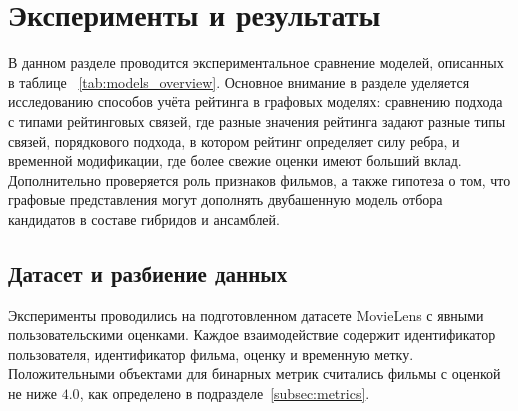 \documentclass[12pt,fleqn]{article}
\begin{document}
\section{Эксперименты и результаты}
\label{sec:experiments}

В данном разделе проводится экспериментальное сравнение моделей, описанных
в таблице ~\ref{tab:models_overview}. 
Основное внимание в разделе уделяется исследованию способов учёта
рейтинга в графовых моделях: сравнению подхода с типами рейтинговых связей, где разные
значения рейтинга задают разные типы связей, порядкового подхода, в котором рейтинг
определяет силу ребра, и временной модификации, где более свежие оценки имеют
больший вклад. Дополнительно проверяется роль признаков фильмов, а также
гипотеза о том, что графовые представления могут дополнять двубашенную
модель отбора кандидатов в составе гибридов и ансамблей.


\subsection{Датасет и разбиение данных}
\label{subsec:experiment_dataset}

Эксперименты проводились на подготовленном датасете MovieLens с явными
пользовательскими оценками. Каждое взаимодействие содержит идентификатор
пользователя, идентификатор фильма, оценку и временную метку. Положительными объектами для бинарных метрик считались фильмы с
оценкой не ниже $4.0$, как определено в подразделе~\ref{subsec:metrics}.
\end{document}
